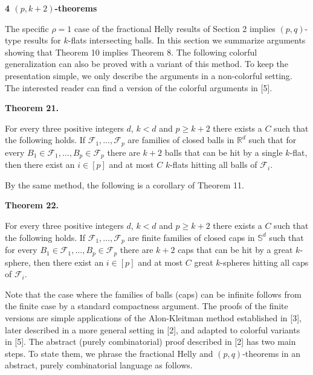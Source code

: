\documentclass[10pt,a4paper]{amsart}
\begin{document}
\par\medskip\noindent\textbf{4 $(p,k+2)$-theorems}\par
The specific $\rho=1$ case of the fractional Helly results of Section 2 implies $(p,q)$-type results for $k$-flats intersecting balls. In this section we summarize arguments showing that Theorem 10 implies Theorem 8. The following colorful generalization can also be proved with a variant of this method. To keep the presentation simple, we only describe the arguments in a non-colorful setting. The interested reader can find a version of the colorful arguments in [5].
\par
\par
\par\medskip\noindent\textbf{Theorem 21.}\par
For every three positive integers $d$, $k<d$ and $p\geq k+2$ there exists a $C$ such that the following holds. If $\mathcal{F}_{1},\ldots,\mathcal{F}_{p}$ are families of closed balls in $\mathbb{R}^{d}$ such that for every $B_{1}\in\mathcal{F}_{1},\ldots,B_{p}\in\mathcal{F}_{p}$ there are $k+2$ balls that can be hit by a single $k$-flat, then there exist an $i\in[p]$ and at most $C$ $k$-flats hitting all balls of $\mathcal{F}_{i}$.
\par
\par
\par
By the same method, the following is a corollary of Theorem 11.
\par
\par
\par\medskip\noindent\textbf{Theorem 22.}\par
For every three positive integers $d$, $k<d$ and $p\geq k+2$ there exists a $C$ such that the following holds. If $\mathcal{F}_{1},\ldots,\mathcal{F}_{p}$ are finite families of closed caps in $\mathbb{S}^{d}$ such that for every $B_{1}\in\mathcal{F}_{1},\ldots,B_{p}\in\mathcal{F}_{p}$ there are $k+2$ caps that can be hit by a great $k$-sphere, then there exist an $i\in[p]$ and at most $C$ great $k$-spheres hitting all caps of $\mathcal{F}_{i}$.
\par
\par
\par
Note that the case where the families of balls (caps) can be infinite follows from the finite case by a standard compactness argument. The proofs of the finite versions are simple applications of the Alon-Kleitman method established in [3], later described in a more general setting in [2], and adapted to colorful variants in [5]. The abstract (purely combinatorial) proof described in [2] has two main steps. To state them, we phrase the fractional Helly and $(p,q)$-theorems in an abstract, purely combinatorial language as follows.
\end{document}
